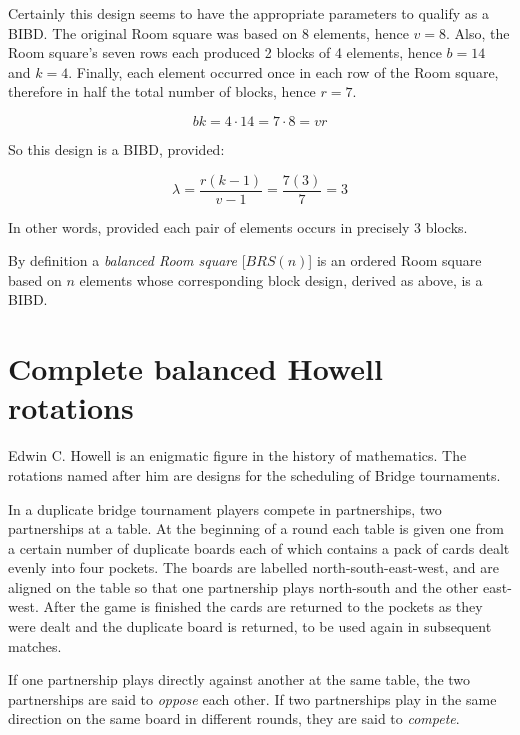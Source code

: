 \documentclass[
  11pt,
  a4paper]{book}
\begin{document}
Certainly this design seems to have the appropriate
parameters to qualify as a BIBD. The original Room square
was based on 8 elements, hence \(v = 8\). Also, the Room
square's seven rows each produced 2 blocks of 4 elements,
hence \(b = 14\) and \(k = 4\). Finally, each element occurred
once in each row of the Room square, therefore in half the
total number of blocks, hence \(r = 7\).

\begin{equation}
bk = 4\cdot 14 = 7 \cdot 8 = vr
\end{equation}

So this design is a BIBD, provided:

\begin{equation}
\lambda = \frac{r(k - 1)}{v - 1} = \frac{7(3)}{7} = 3
\end{equation}

In other words, provided each pair of elements occurs in
precisely 3 blocks.

By definition a \emph{balanced Room square} {[}\(BRS(n)\){]} is an
ordered Room square based on \(n\) elements whose
corresponding block design, derived as above, is a BIBD.

\hypertarget{complete-balanced-howell-rotations}{%
\section{Complete balanced Howell rotations}\label{complete-balanced-howell-rotations}}

Edwin C. Howell is an enigmatic figure in the history of
mathematics. The rotations named after him are designs for
the scheduling of Bridge tournaments.

In a duplicate bridge tournament players compete in
partnerships, two partnerships at a table. At the beginning
of a round each table is given one from a certain number of
duplicate boards each of which contains a pack of cards
dealt evenly into four pockets. The boards are labelled
north-south-east-west, and are aligned on the table so that
one partnership plays north-south and the other east-west.
After the game is finished the cards are returned to the
pockets as they were dealt and the duplicate board is
returned, to be used again in subsequent matches.

If one partnership plays directly against another at the
same table, the two partnerships are said to \emph{oppose} each
other. If two partnerships play in the same direction on the
same board in different rounds, they are said to \emph{compete}.
\end{document}
